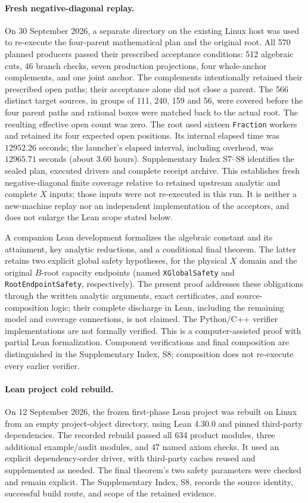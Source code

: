 \documentclass[11pt,reqno]{amsart}
\theoremstyle{definition}
\theoremstyle{remark}
\begin{document}
\paragraph{Fresh negative-diagonal replay.}
On 30 September 2026, a separate directory on the existing Linux host
was used to re-execute the four-parent mathematical plan and the
original root.  All 570 planned producers passed their prescribed
acceptance conditions: 512 algebraic cuts, 46 branch checks, seven
production projections, four whole-anchor complements, and one joint
anchor.  The complements intentionally retained their prescribed
open paths; their acceptance alone did not close a parent.
The 566 distinct target sources, in groups of 111, 240, 159 and 56,
were covered before the four parent paths and rational boxes were
matched back to the actual root.  The resulting effective open count
was zero.  The root used sixteen \texttt{Fraction} workers and retained
its four expected open positions.  Its internal elapsed time was
\(12952.26\) seconds; the launcher's elapsed interval, including overhead,
was \(12965.71\) seconds (about 3.60 hours).
Supplementary Index S7--S8 identifies the sealed plan, executed drivers
and complete receipt archive.  This establishes fresh negative-diagonal
finite coverage relative to retained upstream analytic and complete
\(X\) inputs; those inputs were not re-executed in this run.
It is neither a new-machine replay nor an independent implementation
of the acceptors, and does not enlarge the Lean scope stated below.

A companion Lean development formalizes the algebraic constant and its
attainment, key analytic reductions, and a conditional final theorem.
The latter retains two explicit global safety hypotheses, for the
physical \(X\) domain and the original \(B\)-root capacity endpoints
(named \texttt{XGlobalSafety} and \texttt{RootEndpointSafety}, respectively).
The present proof addresses these obligations through the written
analytic arguments, exact certificates, and source-composition logic;
their complete discharge in Lean, including the remaining model and
coverage connections, is not claimed. The Python/C++ verifier
implementations are not formally verified. This is a computer-assisted
proof with partial Lean formalization. Component verifications and
final composition are distinguished in the Supplementary Index, S8;
composition does not re-execute every earlier verifier.

\paragraph{Lean project cold rebuild.}
On 12 September 2026, the frozen first-phase Lean project was rebuilt
on Linux from an empty project-object directory, using Lean 4.30.0
and pinned third-party dependencies. The recorded rebuild passed
all 634 product modules, three additional example/audit modules,
and 47 named axiom checks. It used an explicit dependency-order
driver, with third-party caches reused and supplemented as needed.
The final theorem's two safety parameters were checked and remain
explicit. The Supplementary Index, S8, records the source identity, successful
build route, and scope of the retained evidence.
\end{document}

